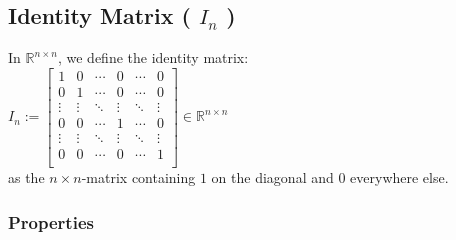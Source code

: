 \subsection{Identity Matrix ( $I_n$ )}

In $\mathbb{R}^{n\times n}$, we define the identity matrix:\\
\vspace{0.5cm}
\hfill
$
    I_n
    := \begin{bmatrix}
        1 & 0 & \cdots & 0 & \cdots & 0 \\
        0 & 1 & \cdots & 0 & \cdots & 0 \\
        \vdots & \vdots & \ddots & \vdots & \ddots & \vdots \\
        0 & 0 & \cdots & 1 & \cdots & 0 \\
        \vdots & \vdots & \ddots & \vdots & \ddots & \vdots \\
        0 & 0 & \cdots & 0 & \cdots & 1 \\
    \end{bmatrix}
    \in \mathbb{R}^{n\times n}
$
\hfill \cite{mfml/book/mml/Deisenroth-Faisal-Ong}
\\
as the $n \times n$-matrix containing $1$ on the diagonal and $0$ everywhere else.




\subsubsection{Properties}

